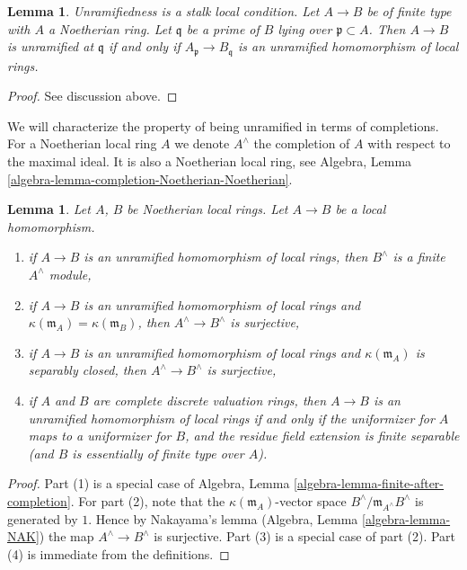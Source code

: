 \documentclass{stacks-project}
\newenvironment{slogan}{\comment}{\endcomment}
\theoremstyle{plain}
\newtheorem{lemma}[subsection]{Lemma}
\theoremstyle{definition}
\theoremstyle{remark}
\numberwithin{equation}{subsection}
\begin{document}
\begin{lemma}
\label{lemma-characterize-unramified-Noetherian}
\begin{slogan}
Unramifiedness is a stalk local condition.
\end{slogan}
Let $A \to B$ be of finite type with $A$ a Noetherian ring.
Let $\mathfrak q$ be a prime of $B$ lying over $\mathfrak p \subset A$.
Then $A \to B$ is unramified at $\mathfrak q$ if and only if
$A_{\mathfrak p} \to B_{\mathfrak q}$ is an unramified homomorphism
of local rings.
\end{lemma}

\begin{proof}
See discussion above.
\end{proof}

\noindent
We will characterize the property of being unramified in terms
of completions. For a Noetherian local ring $A$
we denote $A^\wedge$ the completion of $A$ with respect to the
maximal ideal. It is also a Noetherian local ring, see
Algebra, Lemma \ref{algebra-lemma-completion-Noetherian-Noetherian}.

\begin{lemma}
\label{lemma-unramified-completions}
Let $A$, $B$ be Noetherian local rings.
Let $A \to B$ be a local homomorphism.
\begin{enumerate}
\item if $A \to B$ is an unramified homomorphism of local rings,
then $B^\wedge$ is a finite $A^\wedge$ module,
\item if $A \to B$ is an unramified homomorphism of local rings and
$\kappa(\mathfrak m_A) = \kappa(\mathfrak m_B)$,
then $A^\wedge \to B^\wedge$ is surjective,
\item if $A \to B$ is an unramified homomorphism of local rings
and $\kappa(\mathfrak m_A)$
is separably closed, then $A^\wedge \to B^\wedge$ is surjective,
\item if $A$ and $B$ are complete discrete valuation rings, then
$A \to B$ is an unramified homomorphism of local rings
if and only if the uniformizer for $A$ maps to a uniformizer for $B$,
and the residue field extension is finite separable (and $B$ is
essentially of finite type over $A$).
\end{enumerate}
\end{lemma}

\begin{proof}
Part (1) is a special case of
Algebra, Lemma \ref{algebra-lemma-finite-after-completion}.
For part (2), note that the $\kappa(\mathfrak m_A)$-vector space
$B^\wedge/\mathfrak m_{A^\wedge}B^\wedge$
is generated by $1$. Hence by Nakayama's lemma
(Algebra, Lemma \ref{algebra-lemma-NAK}) the map
$A^\wedge \to B^\wedge$ is surjective.
Part (3) is a special case of part (2).
Part (4) is immediate from the definitions.
\end{proof}
\end{document}
